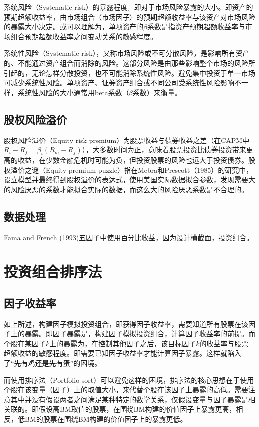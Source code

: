 \documentclass[11pt]{article}
\begin{document}
系统风险（Systematic risk）的暴露程度，即对于市场风险暴露的大小。即资产的预期超额收益率，由市场组合（市场因子）的预期超额收益率与该资产对市场风险的暴露大小决定。或可以理解为，单项资产的$\beta$系数是指资产预期超额收益率与市场组合预期超额收益率之间变动关系的敏感程度。

系统性风险（Systematic risk），又称市场风险或不可分散风险，是影响所有资产的、不能通过资产组合而消除的风险。这部分风险是由那些影响整个市场的风险所引起的，无论怎样分散投资，也不可能消除系统性风险。避免集中投资于单一市场可减少系统性风险。单项资产、证券资产组合或不同公司受系统性风险影响不一样，系统性风险的大小通常用beta系数（$\beta$系数）来衡量。

\subsection{股权风险溢价}

股权风险溢价（Equity risk premium）为股票收益与债券收益之差（在CAPM中$R_i-R_f = \beta_i (R_m-R_f)$），大多数时间为正，意味着股票投资比债券投资带来更高的收益，在少数金融危机时可能为负，但投资股票的风险也远大于投资债券。股权溢价之谜（Equity premium puzzle）指在Mebra和Prescott（1985）的研究中，设立模型并最终得到股权溢价的表达式，使用美国实际数据拟合参数，发现需要大的风险厌恶的系数才能拟合实际的数据，而这么大的风险厌恶系数是不合理的。


\subsection{数据处理}

Fama and French (1993)五因子中使用百分比收益，因为设计横截面，投资组合。

\section{投资组合排序法}

\subsection{因子收益率}

如上所述，构建因子模拟投资组合，即获得因子收益率，需要知道所有股票在该因子上的暴露。即因子暴露是，构建因子模拟投资组合，计算因子收益率的前提。而个股在某因子$k$上的暴露为，在控制其他因子之后，该目标因子$k$的收益率与股票超额收益的敏感程度。即需要已知因子收益率才能计算因子暴露。这样就陷入了“先有鸡还是先有蛋”的困境。

而使用排序法（Portfolio sort）可以避免这样的困境，排序法的核心思想在于使用个股在该变量（因子）上的取值大小，来代替个股在该因子上暴露的高低。需要注意其中并没有假设两者之间满足某种特定的数学关系，仅假设变量与因子暴露是相关联的。即假设高BM取值的股票，在围绕BM构建的价值因子上暴露更高，相反，低BM的股票在围绕BM构建的价值因子上的暴露更低。
\end{document}
